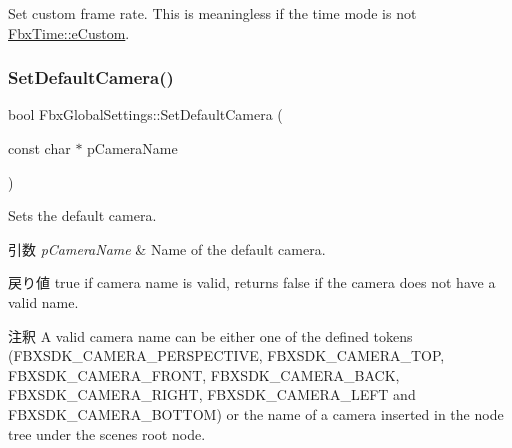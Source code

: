 Set custom frame rate. This is meaningless if the time mode is not \hyperlink{class_fbx_time_acc529b00a0e8d4c3da3702449ca93031afb5f0e69ae6545d1d0efa35400a69a13}{Fbx\+Time\+::e\+Custom}. \mbox{\label{class_fbx_global_settings_a4aad864358aa7d13705fcef1896967ba}} 
\subsubsection{\texorpdfstring{Set\+Default\+Camera()}{SetDefaultCamera()}}
{\footnotesize\ttfamily bool Fbx\+Global\+Settings\+::\+Set\+Default\+Camera (\begin{DoxyParamCaption}\item[{const char $\ast$}]{p\+Camera\+Name }\end{DoxyParamCaption})}

Sets the default camera. 
\begin{DoxyParams}{引数}
{\em p\+Camera\+Name} & Name of the default camera. \\
\hline
\end{DoxyParams}
\begin{DoxyReturn}{戻り値}
{\ttfamily true} if camera name is valid, returns {\ttfamily false} if the camera does not have a valid name. 
\end{DoxyReturn}
\begin{DoxyRemark}{注釈}
A valid camera name can be either one of the defined tokens (F\+B\+X\+S\+D\+K\+\_\+\+C\+A\+M\+E\+R\+A\+\_\+\+P\+E\+R\+S\+P\+E\+C\+T\+I\+VE, F\+B\+X\+S\+D\+K\+\_\+\+C\+A\+M\+E\+R\+A\+\_\+\+T\+OP, F\+B\+X\+S\+D\+K\+\_\+\+C\+A\+M\+E\+R\+A\+\_\+\+F\+R\+O\+NT, F\+B\+X\+S\+D\+K\+\_\+\+C\+A\+M\+E\+R\+A\+\_\+\+B\+A\+CK, F\+B\+X\+S\+D\+K\+\_\+\+C\+A\+M\+E\+R\+A\+\_\+\+R\+I\+G\+HT, F\+B\+X\+S\+D\+K\+\_\+\+C\+A\+M\+E\+R\+A\+\_\+\+L\+E\+FT and F\+B\+X\+S\+D\+K\+\_\+\+C\+A\+M\+E\+R\+A\+\_\+\+B\+O\+T\+T\+OM) or the name of a camera inserted in the node tree under the scene\textquotesingle{}s root node. 
\end{DoxyRemark}
\mbox{\label{class_fbx_global_settings_ae95a4b4d7aa38f72a7fb4f7db79e65e6}} 
